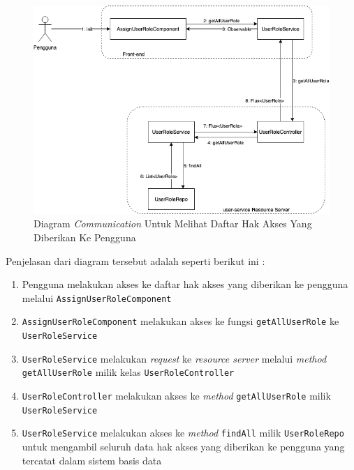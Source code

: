 \documentclass[pdftex,12pt, oneside]{article}
\begin{document}
\begin{itemize}
	\begin{figure}[H]
		\centering
		\includegraphics[width=1\textwidth]{./resources/comm-dia-list-user-role}
		\caption{Diagram \textit{Communication} Untuk Melihat Daftar Hak Akses Yang Diberikan Ke Pengguna}
		\label{fig:comm-dia-list-user-role}
	\end{figure}
	
	Penjelasan dari diagram tersebut adalah seperti berikut ini :
	
	\begin{enumerate}
		\item Pengguna melakukan akses ke daftar hak akses yang diberikan ke pengguna melalui \texttt{AssignUserRoleComponent}
		
		\item \texttt{AssignUserRoleComponent} melakukan akses ke fungsi \texttt{getAllUserRole} ke \texttt{UserRoleService}
		
		\item \texttt{UserRoleService} melakukan \textit{request} ke \textit{resource server} melalui \textit{method} \texttt{getAllUserRole} milik kelas \texttt{UserRoleController}
		
		\item \texttt{UserRoleController} melakukan akses ke \textit{method} \texttt{getAllUserRole} milik \texttt{UserRoleService}
		
		\item \texttt{UserRoleService} melakukan akses ke \textit{method} \texttt{findAll} milik \texttt{UserRoleRepo} untuk mengambil seluruh data hak akses yang diberikan ke pengguna yang tercatat dalam sistem basis data
		

\end{enumerate}
\end{itemize}
\end{document}
